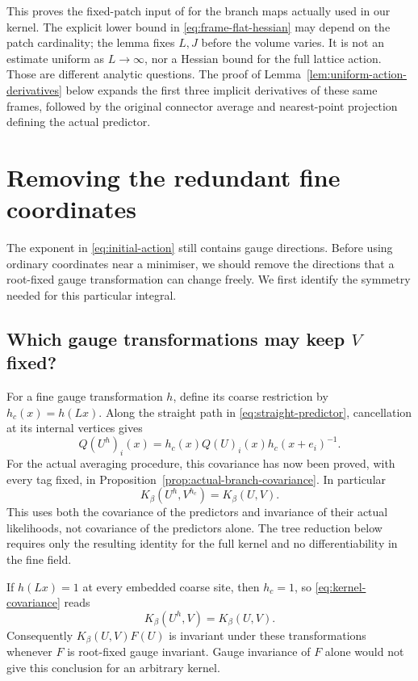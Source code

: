\documentclass[11pt,reqno]{amsart}
\numberwithin{equation}{section}
\theoremstyle{definition}
\theoremstyle{remark}
\begin{document}
This proves the fixed-patch input of
\cite[Lemma~14.1, p.~57]{Main} for the branch maps actually used
in our kernel. The explicit lower bound in
\eqref{eq:frame-flat-hessian} may depend on the patch cardinality;
the lemma fixes \(L,J\) before the volume varies. It is not an
estimate uniform as \(L\to\infty\), nor a Hessian bound for the
full lattice action. Those are different analytic questions.
The proof of Lemma~\ref{lem:uniform-action-derivatives} below
expands the first three implicit derivatives of these same
frames, followed by the original connector average and
nearest-point projection defining the actual predictor.

\section{Removing the redundant fine coordinates}
\label{sec:tree}

The exponent in \eqref{eq:initial-action} still contains gauge
directions. Before using ordinary coordinates near a minimiser, we
should remove the directions that a root-fixed gauge transformation
can change freely. We first identify the symmetry needed for this
particular integral.

\subsection{Which gauge transformations may keep \(V\) fixed?}

For a fine gauge transformation \(h\), define its coarse restriction
by \(h_c(x)=h(Lx)\). Along the straight path in
\eqref{eq:straight-predictor}, cancellation at its internal vertices
gives
\begin{equation}
 Q(U^h)_i(x)=h_c(x)Q(U)_i(x)h_c(x+e_i)^{-1}.
 \label{eq:predictor-covariance}
\end{equation}
For the actual averaging procedure, this covariance has now been
proved, with every tag fixed, in
Proposition~\ref{prop:actual-branch-covariance}. In particular
\begin{equation}
                K_\beta(U^h,V^{h_c})=K_\beta(U,V).
 \label{eq:kernel-covariance}
\end{equation}
This uses both the covariance of the predictors and invariance of
their actual likelihoods, not covariance of the predictors alone.
The tree reduction below requires only the resulting identity for
the full kernel and no differentiability in the fine field.

If \(h(Lx)=1\) at every embedded coarse site, then \(h_c=1\), so
\eqref{eq:kernel-covariance} reads
\begin{equation}
                     K_\beta(U^h,V)=K_\beta(U,V).
 \label{eq:root-kernel}
\end{equation}
Consequently \(K_\beta(U,V)F(U)\) is invariant under these
transformations whenever \(F\) is root-fixed gauge invariant.
Gauge invariance of \(F\) alone would not give this conclusion for
an arbitrary kernel.
\end{document}
